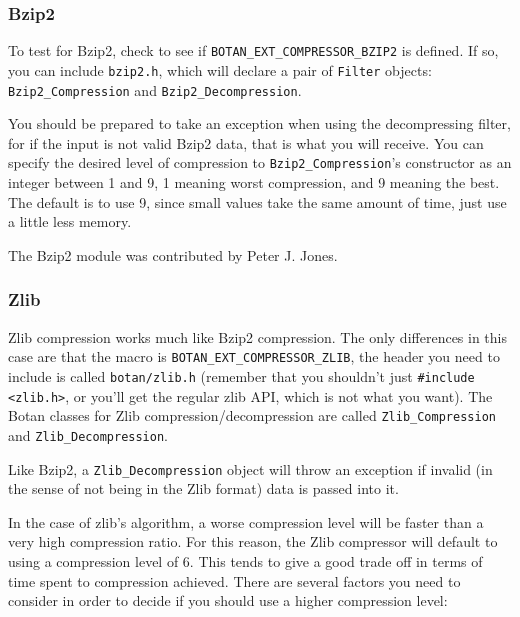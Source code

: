 \documentclass{article}
\newcommand{\filename}[1]{\texttt{#1}}
\newcommand{\macro}[1]{\texttt{#1}}
\newcommand{\type}[1]{\texttt{#1}}
\begin{document}
\subsubsection{Bzip2}

To test for Bzip2, check to see if \macro{BOTAN\_EXT\_COMPRESSOR\_BZIP2} is
defined. If so, you can include \filename{bzip2.h}, which will declare a pair
of \type{Filter} objects: \type{Bzip2\_Compression} and
\type{Bzip2\_Decompression}.

You should be prepared to take an exception when using the decompressing
filter, for if the input is not valid Bzip2 data, that is what you will
receive. You can specify the desired level of compression to
\type{Bzip2\_Compression}'s constructor as an integer between 1 and 9, 1
meaning worst compression, and 9 meaning the best. The default is to use 9,
since small values take the same amount of time, just use a little less memory.

The Bzip2 module was contributed by Peter J. Jones.

\subsubsection{Zlib}

Zlib compression works much like Bzip2 compression. The only
differences in this case are that the macro is
\macro{BOTAN\_EXT\_COMPRESSOR\_ZLIB}, the header you need to include
is called \filename{botan/zlib.h} (remember that you shouldn't just
\verb|#include <zlib.h>|, or you'll get the regular zlib API, which is
not what you want). The Botan classes for Zlib
compression/decompression are called \type{Zlib\_Compression} and
\type{Zlib\_Decompression}.

Like Bzip2, a \type{Zlib\_Decompression} object will throw an exception if
invalid (in the sense of not being in the Zlib format) data is passed into it.

In the case of zlib's algorithm, a worse compression level will be faster than
a very high compression ratio. For this reason, the Zlib compressor will
default to using a compression level of 6. This tends to give a good trade off
in terms of time spent to compression achieved. There are several factors you
need to consider in order to decide if you should use a higher compression
level:
\end{document}
